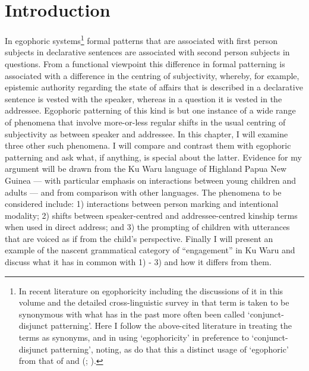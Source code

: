 \documentclass[output=paper]{langsci/langscibook}
\author{Alan Rumsey \affiliation{Australian National University}}
\begin{document}
\maketitle

\section{Introduction}\label{s:ar1} 

In egophoric systems\footnote{In recent literature on egophoricity including the discussions of it in this volume and the detailed cross-linguistic survey in \cite{SanRoqueSchieffelin2018} that term is taken to be synonymous with what has in the past more often been called ‘conjunct-disjunct patterning’. Here I follow the above-cited literature in treating the terms as synonyms, and in using ‘egophoricity’ in preference to ‘conjunct-disjunct patterning’, noting, as do \citeauthor{SanRoqueSchieffelin2018} that this a distinct usage of ‘egophoric’ from that of  \cite{Hagege1974} and \citeauthor{Dahl2001} (\citeyear{Dahl2001}; \citeyear{Dahl2008}).} formal patterns that are associated with first person subjects in declarative sentences are associated with second person subjects in questions.  From a functional viewpoint this difference in formal patterning is associated with a difference in the centring of subjectivity, whereby, for example, epistemic authority regarding the state of affairs that is described in a declarative sentence is vested with the speaker, whereas in a question it is vested in the addressee.
Egophoric patterning of this kind is but one instance of a wide range of phenomena that involve more-or-less regular shifts in the usual centring of subjectivity as between speaker and addressee. In this chapter, I will examine three other such phenomena. I will compare and contrast them with egophoric patterning and ask what, if anything, is special about the latter. Evidence for my argument will be drawn from the Ku Waru language of Highland Papua New Guinea —  with particular emphasis on interactions between young children and adults —  and from comparison with other languages. The phenomena to be considered include: 1) interactions between person marking and intentional modality; 2) shifts between speaker-centred and addressee-centred kinship terms when used in direct address; and 3) the prompting of children with utterances that are voiced as if from the child’s perspective. Finally I will present an example of the nascent grammatical category of “engagement” in Ku Waru and discuss what it has in common with 1) - 3) and how it differs from them.
\end{document}
